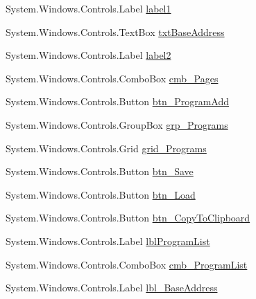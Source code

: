 \begin{DoxyCompactItemize}
\item 
System.\+Windows.\+Controls.\+Label \hyperlink{class_c_p_u___o_s___simulator_1_1_main_window_a09b3ba374a620331bc447b32959260c2}{label1}
\item 
System.\+Windows.\+Controls.\+Text\+Box \hyperlink{class_c_p_u___o_s___simulator_1_1_main_window_aa6eeef1bfdd74aa90d6fea68987306ad}{txt\+Base\+Address}
\item 
System.\+Windows.\+Controls.\+Label \hyperlink{class_c_p_u___o_s___simulator_1_1_main_window_a88c7b6748a5e198c673a3c3c5178d3b8}{label2}
\item 
System.\+Windows.\+Controls.\+Combo\+Box \hyperlink{class_c_p_u___o_s___simulator_1_1_main_window_a8da421354f40baef03909c87c3407e3c}{cmb\+\_\+\+Pages}
\item 
System.\+Windows.\+Controls.\+Button \hyperlink{class_c_p_u___o_s___simulator_1_1_main_window_a4f0d9f8f3d56b76616367438d04b4fde}{btn\+\_\+\+Program\+Add}
\item 
System.\+Windows.\+Controls.\+Group\+Box \hyperlink{class_c_p_u___o_s___simulator_1_1_main_window_a2cafe5a8b54ae3e95a770abc594519a0}{grp\+\_\+\+Programs}
\item 
System.\+Windows.\+Controls.\+Grid \hyperlink{class_c_p_u___o_s___simulator_1_1_main_window_a7a4cb93db4cde3b227cbc3155af574d2}{grid\+\_\+\+Programs}
\item 
System.\+Windows.\+Controls.\+Button \hyperlink{class_c_p_u___o_s___simulator_1_1_main_window_a638eee3b21f6ac5d28a5c95c4dad3fc2}{btn\+\_\+\+Save}
\item 
System.\+Windows.\+Controls.\+Button \hyperlink{class_c_p_u___o_s___simulator_1_1_main_window_a29fbdb7afddedc9425472096337ee13b}{btn\+\_\+\+Load}
\item 
System.\+Windows.\+Controls.\+Button \hyperlink{class_c_p_u___o_s___simulator_1_1_main_window_ad56a38e017d6d47d2076b1ec33e3521d}{btn\+\_\+\+Copy\+To\+Clipboard}
\item 
System.\+Windows.\+Controls.\+Label \hyperlink{class_c_p_u___o_s___simulator_1_1_main_window_a9cbfc378965cf635e61c760e11dd5c8a}{lbl\+Program\+List}
\item 
System.\+Windows.\+Controls.\+Combo\+Box \hyperlink{class_c_p_u___o_s___simulator_1_1_main_window_a9871f5933923725d4386a7a7f3f8828f}{cmb\+\_\+\+Program\+List}
\item 
System.\+Windows.\+Controls.\+Label \hyperlink{class_c_p_u___o_s___simulator_1_1_main_window_ae3adff2ef98d792ce094dcc229c293a8}{lbl\+\_\+\+Base\+Address}
\item 

\end{DoxyCompactItemize}
